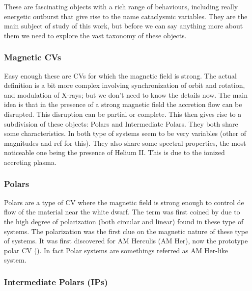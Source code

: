 These are fascinating objects with a rich range of behaviours, including really energetic outburst that give rise to the name cataclysmic variables. They are the main subject of study of this work, but before we can say anything more about them we need to explore the vast taxonomy of these objects. %

\subsubsection{Magnetic CVs}

Easy enough these are CVs for which the magnetic field is strong. The actual definition is a bit more complex involving synchronization of orbit and rotation, and modulation of X-rays; but we don't need to know the details now. The main idea is that in the presence of a strong magnetic field the accretion flow can be disrupted. This disruption can be partial or complete. This then gives rise to a subdivision of these objects: Polars and Intermediate Polars.  They both share some characteristics. In both type of systems seem to be very variables (other of magnitudes and ref for this). They also share some spectral properties, the most noticeable one being the presence of Helium II. This is due to the ionized accreting plasma. 


\subsubsection{Polars}

Polars are a type of CV where the magnetic field is strong enough to control de flow of the material near the white dwarf. The term was first coined by \cite{krzeminski_extremely_1977} due to the high degree of polarization (both circular and linear) found in these type of systems. The polarization was the first clue on the magnetic nature of these type of systems. It was first discovered for AM Herculis (AM Her), now the prototype polar CV (\cite{tapia_discovery_1977}). In fact Polar systems are somethings referred as AM Her-like system. 



\subsubsection{Intermediate Polars (IPs)}

